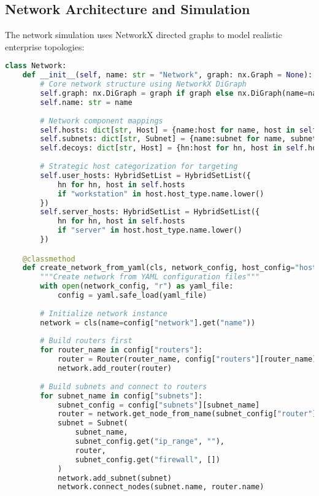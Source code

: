 \documentclass[12pt,a4paper]{article}
\begin{document}
\subsection{Network Architecture and Simulation}

The network simulation uses NetworkX directed graphs to model realistic enterprise topologies:

\begin{lstlisting}[language=Python, caption=Network Base Implementation]
class Network:
    def __init__(self, name: str = "Network", graph: nx.Graph = None):
        # Core network structure using NetworkX DiGraph
        self.graph: nx.DiGraph = graph if graph else nx.DiGraph(name=name)
        self.name: str = name
        
        # Network component mappings
        self.hosts: dict[str, Host] = {name:host for name, host in self if isinstance(host, Host)}
        self.subnets: dict[str, Subnet] = {name:subnet for name, subnet in self if isinstance(subnet, Subnet)}
        self.decoys: dict[str, Host] = {hn:host for hn, host in self.hosts if host.decoy}
        
        # Strategic host categorization for targeting
        self.user_hosts: HybridSetList = HybridSetList({
            hn for hn, host in self.hosts 
            if "workstation" in host.host_type.name.lower()
        })
        self.server_hosts: HybridSetList = HybridSetList({
            hn for hn, host in self.hosts 
            if "server" in host.host_type.name.lower()
        })

    @classmethod
    def create_network_from_yaml(cls, network_config, host_config="host_defs_services.yaml"):
        """Create network from YAML configuration files"""
        with open(network_config, "r") as yaml_file:
            config = yaml.safe_load(yaml_file)
        
        # Initialize network instance
        network = cls(name=config["network"].get("name"))
        
        # Build routers first
        for router_name in config["routers"]:
            router = Router(router_name, config["routers"][router_name].get("firewall", []))
            network.add_router(router)
        
        # Build subnets and connect to routers
        for subnet_name in config["subnets"]:
            subnet_config = config["subnets"][subnet_name]
            router = network.get_node_from_name(subnet_config["router"])
            subnet = Subnet(
                subnet_name,
                subnet_config.get("ip_range", ""),
                router,
                subnet_config.get("firewall", [])
            )
            network.add_subnet(subnet)
            network.connect_nodes(subnet.name, router.name)
        

\end{lstlisting}
\end{document}
